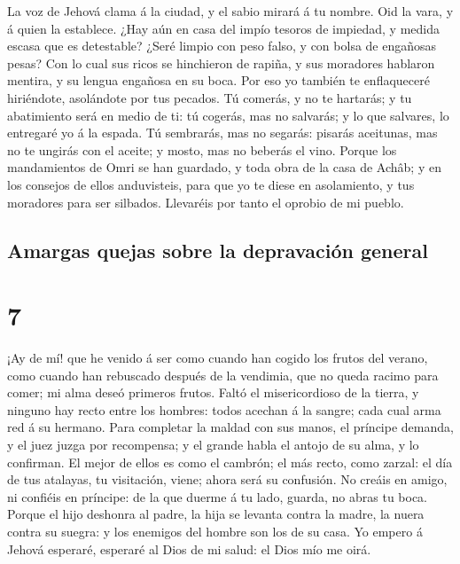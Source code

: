  La voz de Jehová clama á la ciudad, y el sabio mirará á
tu nombre. Oid la vara, y á quien la establece.  ¿Hay aún
en casa del impío tesoros de impiedad, y medida escasa que es
detestable?  ¿Seré limpio con peso falso, y con bolsa de
engañosas pesas?  Con lo cual sus ricos se hinchieron de
rapiña, y sus moradores hablaron mentira, y su lengua engañosa en su
boca.  Por eso yo también te enflaqueceré hiriéndote,
asolándote por tus pecados.  Tú comerás, y no te
hartarás; y tu abatimiento será en medio de ti: tú cogerás, mas no
salvarás; y lo que salvares, lo entregaré yo á la espada.
 Tú sembrarás, mas no segarás: pisarás aceitunas, mas no
te ungirás con el aceite; y mosto, mas no beberás el vino.
 Porque los mandamientos de Omri se han guardado, y toda
obra de la casa de Achâb; y en los consejos de ellos anduvisteis, para
que yo te diese en asolamiento, y tus moradores para ser silbados.
Llevaréis por tanto el oprobio de mi pueblo.

\hypertarget{amargas-quejas-sobre-la-depravaciuxf3n-general}{%
\subsection{Amargas quejas sobre la depravación
general}\label{amargas-quejas-sobre-la-depravaciuxf3n-general}}

\hypertarget{section-33-7}{%
\section{7}\label{section-33-7}}

 ¡Ay de mí! que he venido á ser como cuando han cogido los
frutos del verano, como cuando han rebuscado después de la vendimia, que
no queda racimo para comer; mi alma deseó primeros frutos.
 Faltó el misericordioso de la tierra, y ninguno hay recto
entre los hombres: todos acechan á la sangre; cada cual arma red á su
hermano.  Para completar la maldad con sus manos, el
príncipe demanda, y el juez juzga por recompensa; y el grande habla el
antojo de su alma, y lo confirman.  El mejor de ellos es
como el cambrón; el más recto, como zarzal: el día de tus atalayas, tu
visitación, viene; ahora será su confusión.  No creáis en
amigo, ni confiéis en príncipe: de la que duerme á tu lado, guarda, no
abras tu boca.  Porque el hijo deshonra al padre, la hija
se levanta contra la madre, la nuera contra su suegra: y los enemigos
del hombre son los de su casa.  Yo empero á Jehová
esperaré, esperaré al Dios de mi salud: el Dios mío me oirá.

